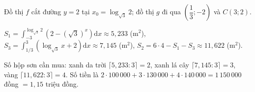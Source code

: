 \begin{ex}
{Đồ thị $f$ cắt đường $y=2$ tại $x_0=\log_{\sqrt3}2$; đồ thị $g$ đi qua $\left(\dfrac13;-2\right)$ và $C(3;2)$.

$S_1=\displaystyle\int_{-3}^{\log_{\sqrt3}2}\left(2-(\sqrt3)^x\right)\mathrm dx\approx5{,}233$ (m$^2$), $S_3=\displaystyle\int_{1/3}^3\left(\log_{\sqrt3}x+2\right)\mathrm dx\approx7{,}145$ (m$^2$), $S_2=6\cdot4-S_1-S_3\approx11{,}622$ (m$^2$).

Số hộp sơn cần mua: xanh da trời $\lceil5{,}233:3\rceil=2$, xanh lá cây $\lceil7{,}145:3\rceil=3$, vàng $\lceil11{,}622:3\rceil=4$. Số tiền là $2\cdot100\,000+3\cdot130\,000+4\cdot140\,000=1\,150\,000$ đồng $=1{,}15$ triệu đồng.}
\end{ex}
